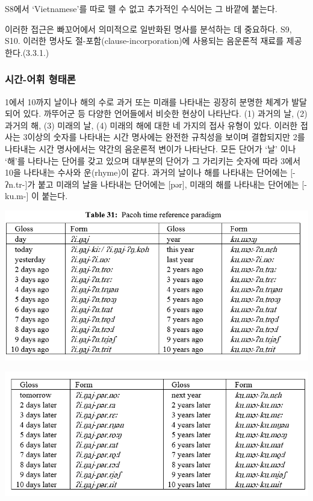 S8에서 `Vietnamese'를 따로 뗄 수 없고 추가적인 수식어는 그 바깥에 붙는다.

이러한 접근은 빠꼬어에서 의미적으로 일반화된 명사를 분석하는 데 중요하다.
S9, S10.
이러한 명사도 절-포함(clause-incorporation)에 사용되는 음운론적 재료를 제공한다.(3.3.1.)

\subsubsection{시간-어휘 형태론}
1에서 10까지 날이나 해의 수로 과거 또는 미래를 나타내는 굉장히 분명한 체계가 발달되어 있다. 까뚜어군 등 다양한 언어들에서 비슷한 현상이 나타난다.
(1) 과거의 날, (2) 과거의 해, (3) 미래의 날, (4) 미래의 해에 대한 네 가지의 접사 유형이 있다. 이러한 접사는 3이상의 숫자를 나타내는 시간 명사에는 완전한 규칙성을 보이며 결합되지만 2를 나타내는 시간 명사에서는 약간의 음운론적 변이가 나타난다.
모든 단어가 `날' 이나 `해'를 나타나는 단어를 갖고 있으며 대부분의 단어가 그 가리키는 숫자에 따라 3에서 10을 나타내는 수사와 운(rhyme)이 같다. 과거의 날이나 해를 나타내는 단어에는 [-ʔn.tr-]가 붙고 미래의 날을 나타내는 단어에는 [pər], 미래의 해를 나타내는 단어에는 [-ku.m-] 이 붙는다.

\includegraphics{Pacoh/src/PacohTable31-1.png}

\includegraphics{Pacoh/src/PacohTable31-2.png}

